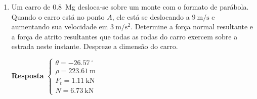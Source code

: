\documentclass[a4paper,12pt]{article}
\begin{document}
\begin{enumerate}
		\item Um carro de \SI{0.8}{\mega\g} desloca-se sobre um monte com o formato de parábola. Quando o carro está no ponto $A$, ele está se deslocando a $\SI{9}{\meter/\second}$ e aumentando sua velocidade em $\SI{3}{\meter/\second^{2}}$. Determine a força normal resultante e a força de atrito resultantes que todas as rodas do carro exercem sobre a estrada neste instante. Despreze a dimensão do carro.
		
		\textbf{Resposta}
		$
		\begin{cases}
		\theta=\SI{-26.57}{^{\circ}}\\
		\rho=\SI{223.61}{\meter}\\
		F_{t}=\SI{1.11}{\kilo\newton}\\
		N=\SI{6.73}{\kilo\newton}
		\end{cases}
		$
	\end{enumerate}
\end{document}
